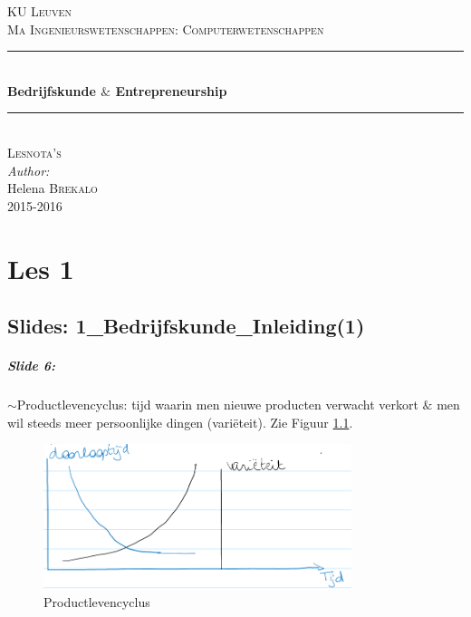 \documentclass[10pt,a4paper]{report}
\author{Helena Brekalo}
\begin{document}
\begin{titlepage}

\newcommand{\HRule}{\rule{\linewidth}{0.5mm}} %

\center %
 
\textsc{\LARGE KU Leuven}\\[1.5cm] %
\textsc{\Large Ma Ingenieurswetenschappen: Computerwetenschappen}\\[0.5cm] %


\HRule \\[0.4cm]
{ \huge \bfseries Bedrijfskunde $\&$ Entrepreneurship}\\[0.4cm]
\HRule \\[1.5cm]


\textsc{\large Lesnota's}\\[0.5cm] %


\Large \emph{Author:}\\
Helena \textsc{Brekalo}\\[3cm]

{\large 2015-2016}\\[3cm] %

\vfill %

\end{titlepage}

\tableofcontents
\clearpage

\chapter{Les 1}

\section{Slides: 1\_Bedrijfskunde\_Inleiding(1)}

\paragraph{Slide 6:} $\sim$Productlevencyclus: tijd waarin men nieuwe producten verwacht verkort $\&$ men wil steeds meer persoonlijke dingen (vari\"eteit). Zie Figuur \ref{les1_01}.

\begin{figure}[h!]
\centering
\includegraphics[width=90mm]{Les1_01.png}
\caption{Productlevencyclus} 
\label{les1_01}
\end{figure}
\end{document}

